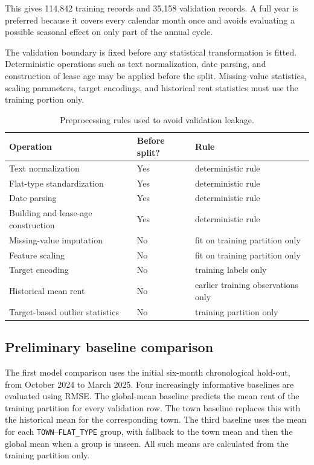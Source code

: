 \documentclass[10pt]{article}
\begin{document}
This gives 114{,}842 training records and 35{,}158 validation records.
A full year is preferred because it covers every calendar month once and avoids evaluating a possible seasonal effect on only part of the annual cycle.

The validation boundary is fixed before any statistical transformation is fitted.
Deterministic operations such as text normalization, date parsing, and construction of lease age may be applied before the split.
Missing-value statistics, scaling parameters, target encodings, and historical rent statistics must use the training portion only.

\begin{table}[h]
\centering
\small
\begin{tabular}{lll}
\toprule
Operation & Before split? & Rule \\
\midrule
Text normalization & Yes & deterministic rule \\
Flat-type standardization & Yes & deterministic rule \\
Date parsing & Yes & deterministic rule \\
Building and lease-age construction & Yes & deterministic rule \\
Missing-value imputation & No & fit on training partition only \\
Feature scaling & No & fit on training partition only \\
Target encoding & No & training labels only \\
Historical mean rent & No & earlier training observations only \\
Target-based outlier statistics & No & training partition only \\
\bottomrule
\end{tabular}
\caption{Preprocessing rules used to avoid validation leakage.}
\label{tab:preprocessing-leakage}
\end{table}

\subsection{Preliminary baseline comparison}

The first model comparison uses the initial six-month chronological hold-out, from October 2024 to March 2025.
Four increasingly informative baselines are evaluated using RMSE.
The global-mean baseline predicts the mean rent of the training partition for every validation row.
The town baseline replaces this with the historical mean for the corresponding town.
The third baseline uses the mean for each \texttt{TOWN}--\texttt{FLAT\_TYPE} group, with fallback to the town mean and then the global mean when a group is unseen.
All such means are calculated from the training partition only.
\end{document}

